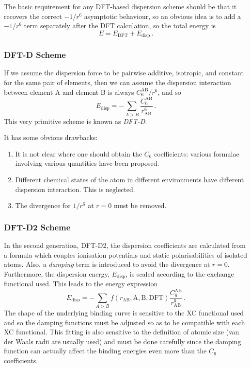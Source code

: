 \documentclass{article}
\theoremstyle{plain}\theoremheaderfont{\normalfont\itshape}\theorembodyfont{\rmfamily}\theoremseparator{.}\newtheorem*{rem}{Remark}\newtheorem*{ex}{Example}\newtheorem*{proof}{Proof}\newtheorem*{altp}{Alternative proof}
\theoremstyle{plain}\theoremheaderfont{\normalfont\bfseries}\theorembodyfont{\rmfamily}\theoremseparator{.}\newtheorem{thm}{Theorem}[section]\newtheorem{lem}[thm]{Lemma}\newtheorem{prop}[thm]{Proposition}\newtheorem*{cor}{Corollary}\newtheorem{defn}[thm]{Definition}\newtheorem{clm}[thm]{Claim}\newtheorem{clminproof}{Claim}\newtheorem{pos}{Postulate}[section]
\theoremstyle{break}\theoremheaderfont{\normalfont\itshape}\theorembodyfont{\rmfamily}\theoremseparator{.\medskip}\newtheorem*{proofskip}{Proof}\newtheorem*{exs}{Examples}\newtheorem*{rems}{Remarks}
\theoremstyle{break}\theoremheaderfont{\normalfont\bfseries}\theorembodyfont{\rmfamily}\theoremseparator{.\medskip}\newtheorem{lemskip}[thm]{Lemma}\newtheorem{defnskip}[thm]{Definition}\newtheorem{propskip}[thm]{Proposition}\newtheorem{thmskip}[thm]{Theorem}
\numberwithin{equation}{section}
\begin{document}
    The basic requirement for any DFT-based dispersion scheme should be that it recovers the correct \(-1/r^6\) asymptotic behaviour, so an obvious idea is to add a \(-1/r^6\) term separately after the DFT calculation, so the total energy is
    \begin{equation}
        E=E_{\text{DFT}}+E_{\text{disp}}\,.
    \end{equation}

    \subsubsection*{DFT-D Scheme}
    If we assume the dispersion force to be pairwise additive, isotropic, and constant for the same pair of elements, then we can assume the dispersion interaction between element A and element B is always \(C_6^{\mathrm{AB}}/r^6\), and so
    \begin{equation}
        E_{\text{disp}}=-\sum_{A>B}\frac{C_6^{\mathrm{AB}}}{r_{\mathrm{AB}}^6}\,.
    \end{equation}
    This very primitive scheme is known as \textit{DFT-D}.

    It has some obvious drawbacks:
    \begin{enumerate}[topsep=0pt,label=(\roman*)]
        \item It is not clear where one should obtain the \(C_6\) coefficients: various formulae involving various quantities have been proposed.
        \item Different chemical states of the atom in different environments have different dispersion interaction. This is neglected.
        \item The divergence for \(1/r^6\) at \(r=0\) must be removed.
    \end{enumerate}

    \subsubsection*{DFT-D2 Scheme}
    In the second generation, DFT-D2, the dispersion coefficients are calculated from a formula which couples ionisation potentials and static polarisabilities of isolated atoms. Also, a \textit{damping} term is introduced to avoid the divergence at \(r=0\). Furthermore, the dispersion energy, \(E_{\text{disp}}\), is scaled according to the exchange functional used. This leads to the energy expression
    \begin{equation}
        E_{\text{disp}}=-\sum_{A>B}f(r_{\mathrm{AB}},\mathrm{A,B},\text{DFT})\frac{C_6^{\mathrm{AB}}}{r_{\mathrm{AB}}^6}\,.
    \end{equation}
    The shape of the underlying binding curve is sensitive to the XC functional used and so the damping functions must be adjusted so as to be compatible with each XC functional. This fitting is also sensitive to the definition of atomic size (van der Waals radii are usually used) and must be done carefully since the damping function can actually affect the binding energies even more than the \(C_6\) coefficients.
\end{document}
